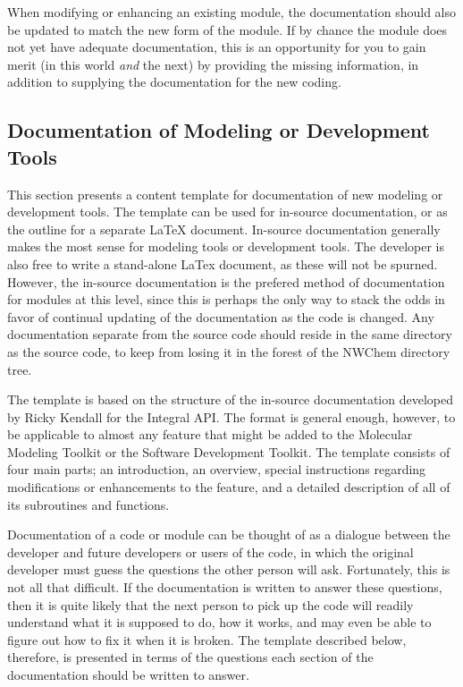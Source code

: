 When modifying or enhancing an existing module, the documentation should also be
updated to match the new form of the module.  If by chance the module does not
yet have adequate documentation, 
this is an opportunity for you to gain merit (in this world
{\em and} the next) by providing the missing information, 
in addition to supplying the
documentation for the new coding.

\subsection{Documentation of Modeling or Development Tools}

This section
presents a content template for documentation of new modeling or 
development tools.  The template can be used for in-source documentation,
or as the outline for a separate LaTeX document.
In-source documentation generally makes the most sense for modeling tools
or development tools. The developer is also free to write a 
stand-alone LaTex document, as these will not be spurned.  However, the
in-source documentation is the prefered method of documentation
for modules at this level, since
this is perhaps the only way to stack the odds in favor of continual updating
of the documentation as the code is changed.  Any documentation separate from
the source code
should reside in the same directory as the source code, to keep from losing it
in the forest of the NWChem directory tree.

The template is based on the structure of the in-source documentation
developed by Ricky Kendall for the Integral API.  The format
is general enough, however, to be applicable to almost any 
feature that might be added to the Molecular Modeling Toolkit or
the Software Development Toolkit.  The template consists of four main parts; 
an introduction, an overview, special instructions regarding modifications
or enhancements to the feature, and a detailed description of all of
its subroutines
and functions.  


Documentation of a code or module can be thought of as a dialogue between the
developer and future developers or users of the code, in which the original developer
must guess the questions the other person will ask.  Fortunately, this is 
not all that difficult.  If the documentation is written to answer these 
questions, then it is quite likely that the next person to pick up the
code will readily understand what it is supposed to do, how it works, and
may even be able to figure out how to fix it when it is broken.  The template
described below, therefore, is presented in terms of the questions each
section of the documentation should be written to answer.

